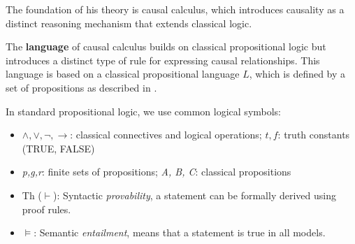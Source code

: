 \documentclass[seminar,palatino,english]{AIGpaper}
\newcommand{\ignore}[1]{}
\begin{document}
\ignore{
    \begin{itemize}
        \item Formalism for causal reasoning.
            \item Semantics and logic layers.
        \item Expands classical logic.
    \end{itemize}
    \begin{itemize}
    \item The causal calculus provides a general logical formalism for causal reasoning.
        \item It operates on two layers: nonmonotonic semantics and the logic of causal rules.
    \item His work builds upon previous research (Geffner 92, McCain and Turner 97, Lifschitz 97, Pearl), expanding on classical logic to accommodate causal reasoning.
    \item Knowledge is represented through cause-effect relationships.
    \item His framework uses classical propositional logic as a basis.
    \item The language consists of a set of causal rules built on top of a set of propositions.
    \item Syntactic provability (Th) is based on formal proof rules; semantic entailment ($\vDash$) on truth in all models.
    \item  Propositions can be grouped as propositional atoms (\textit{p,g,r}) and classical propositions (\textit{A, B, C}).
\end{itemize}
}


The foundation of his theory is causal calculus, which introduces causality as a distinct reasoning mechanism that extends classical logic.

The \textbf{language} of causal calculus builds on classical propositional logic but introduces a distinct type of rule for expressing causal relationships. This language is based on a classical propositional language $L$, which is defined by a set of propositions as described in \cite[79]{bochman_logical_2021}.

In standard propositional logic, we use common logical symbols:

        \begin{itemize}
            \item $\land, \lor, \neg, \to$: classical connectives and logical operations; $t, f$: truth constants (TRUE, FALSE)
            \item \textit{p,g,r}: finite sets of propositions; \textit{A, B, C}: classical propositions
            \item Th ($\vdash$): Syntactic \textit{provability}, a statement can be formally derived using proof rules.
            \item $\vDash$: Semantic \textit{entailment}, means that a statement is true in all models.
        \end{itemize}
\end{document}
